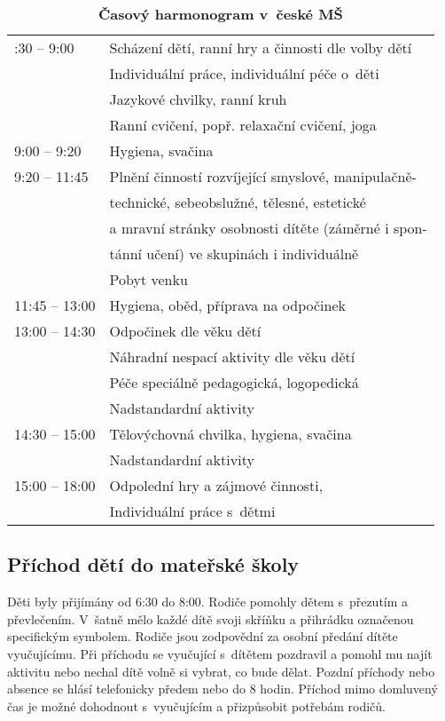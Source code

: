 		\begin{spacing}{1.0}
		\begin{table}[h!]
			\center
			\begin{tabular}{|l l|}
				\rowcolor{white}
				\hline
			6:30 – 9:00				& Scházení dětí, ranní hry a činnosti dle volby dětí 	\\ 
									& Individuální práce, individuální péče o~děti\\
									& Jazykové chvilky, ranní kruh 	\\
									& Ranní cvičení, popř. relaxační cvičení, joga \\
			9:00 – 9:20				& Hygiena, svačina	\\
			9:20 – 11:45			& Plnění činností rozvíjející smyslové, manipulačně-	\\
									& technické, sebeobslužné, tělesné, estetické \\
									& a mravní stránky osobnosti dítěte (záměrné i spon- \\
									& tánní učení) ve skupinách i individuálně \\
									& Pobyt venku					\\
			11:45 – 13:00			& Hygiena, oběd, příprava na odpočinek					\\
			13:00 – 14:30			& Odpočinek dle věku dětí						\\
									& Náhradní nespací aktivity dle věku dětí 				\\
									& Péče speciálně pedagogická, logopedická				\\ 
									& Nadstandardní aktivity 							 \\
			14:30 – 15:00			& Tělovýchovná chvilka, hygiena, svačina 			\\
									& Nadstandardní aktivity 		\\
			15:00 – 18:00			& Odpolední hry a zájmové činnosti, \\
									& Individuální práce s~dětmi\\
			\hline
			\end{tabular}
			\caption{ \textbf{Časový harmonogram v~české MŠ}
			}
			\label{tab:rezimDneCR}
		\end{table}
		\end{spacing}

		\subsection{Příchod dětí do mateřské školy}
			
			Děti byly přijímány od 6:30 do 8:00. Rodiče pomohly dětem s~přezutím a převlečením. V~šatně mělo každé dítě svoji skříňku a přihrádku označenou specifickým symbolem. Rodiče jsou zodpovědní za osobní předání dítěte vyučujícímu. Při příchodu se vyučující s~dítětem pozdravil a pomohl mu najít aktivitu nebo nechal dítě volně si vybrat, co bude dělat. Pozdní příchody nebo absence se hlásí telefonicky předem nebo do 8 hodin. Příchod mimo domluvený čas je možné dohodnout s~vyučujícím a přizpůsobit potřebám rodičů.


